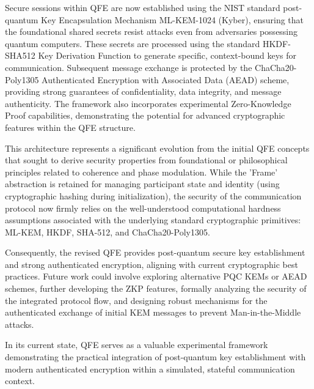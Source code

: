 \documentclass[11pt]{article}
\begin{document}
	Secure sessions within QFE are now established using the NIST standard post-quantum Key Encapsulation Mechanism ML-KEM-1024 (Kyber), ensuring that the foundational shared secrets resist attacks even from adversaries possessing quantum computers. These secrets are processed using the standard HKDF-SHA512 Key Derivation Function to generate specific, context-bound keys for communication. Subsequent message exchange is protected by the ChaCha20-Poly1305 Authenticated Encryption with Associated Data (AEAD) scheme, providing strong guarantees of confidentiality, data integrity, and message authenticity. The framework also incorporates experimental Zero-Knowledge Proof capabilities, demonstrating the potential for advanced cryptographic features within the QFE structure.
	
	This architecture represents a significant evolution from the initial QFE concepts that sought to derive security properties from foundational or philosophical principles related to coherence and phase modulation. While the 'Frame' abstraction is retained for managing participant state and identity (using cryptographic hashing during initialization), the security of the communication protocol now firmly relies on the well-understood computational hardness assumptions associated with the underlying standard cryptographic primitives: ML-KEM, HKDF, SHA-512, and ChaCha20-Poly1305.
	
	Consequently, the revised QFE provides post-quantum secure key establishment and strong authenticated encryption, aligning with current cryptographic best practices. Future work could involve exploring alternative PQC KEMs or AEAD schemes, further developing the ZKP features, formally analyzing the security of the integrated protocol flow, and designing robust mechanisms for the authenticated exchange of initial KEM messages to prevent Man-in-the-Middle attacks.
	
	In its current state, QFE serves as a valuable experimental framework demonstrating the practical integration of post-quantum key establishment with modern authenticated encryption within a simulated, stateful communication context.
	
\end{document}
